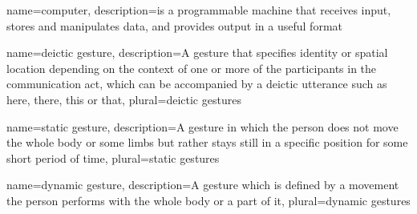 


{
  name=computer,
  description={is a programmable machine that receives input,
               stores and manipulates data, and provides
               output in a useful format}
}

{
    name={deictic gesture},
    description={A gesture that specifies identity or spatial location depending on the context of one or more of the participants in the communication act, which can be accompanied by a deictic utterance such as here, there, this or that},
    plural={deictic gestures}
}

{
    name={static gesture},
    description={A gesture in which the person does not move the whole body or some limbs but rather stays still in a specific position for some short period of time},
    plural={static gestures}
}

{
    name={dynamic gesture},
    description={A gesture which is defined by a movement the person performs with the whole body or a part of it},
    plural={dynamic gestures}
}

